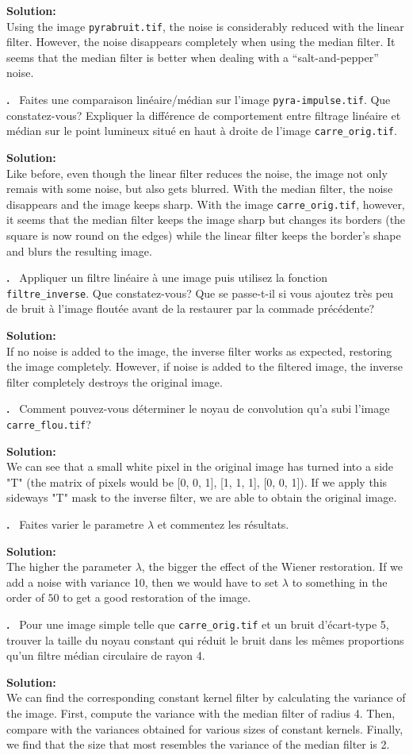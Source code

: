\documentclass{article}
\newcounter{problem}
\newcounter{solution}
\newcommand\Problem{%
  \stepcounter{problem}%
  \textbf{\theproblem.}~%
  \setcounter{solution}{0}%
}
\newcommand\Solution{%
  \textbf{Solution:}\\%
}
\begin{document}
\Solution Using the image \texttt{pyrabruit.tif}, the noise is considerably reduced with the linear filter. However, the noise disappears completely when using the median filter. It seems that the median filter is better when dealing with a ``salt-and-pepper'' noise.

\Problem Faites une comparaison linéaire/médian sur l'image \texttt{pyra-impulse.tif}. Que constatez-vous? Expliquer la différence de comportement entre filtrage linéaire et médian sur le point lumineux situé en haut à droite de l'image \texttt{carre\_orig.tif}.

\Solution Like before, even though the linear filter reduces the noise, the image not only remais with some noise, but also gets blurred. With the median filter, the noise disappears and the image keeps sharp. With the image \texttt{carre\_orig.tif}, however, it seems that the median filter keeps the image sharp but changes its borders (the square is now round on the edges) while the linear filter keeps the border's shape and blurs the resulting image.

\Problem Appliquer un filtre linéaire à une image puis utilisez la fonction \texttt{filtre\_inverse}. Que constatez-vous? Que se passe-t-il si vous ajoutez très peu de bruit à l'image floutée avant de la restaurer par la commade précédente?

\Solution If no noise is added to the image, the inverse filter works as expected, restoring the image completely. However, if noise is added to the filtered image, the inverse filter completely destroys the original image.

\Problem Comment pouvez-vous déterminer le noyau de convolution qu'a subi l'image \texttt{carre\_flou.tif}?

\Solution We can see that a small white pixel in the original image has turned into a side "T" (the matrix of pixels would be [0, 0, 1], [1, 1, 1], [0, 0, 1]). If we apply this sideways "T" mask to the inverse filter, we are able to obtain the original image.

\Problem Faites varier le parametre $\lambda$ et commentez les résultats.

\Solution The higher the parameter $\lambda$, the bigger the effect of the Wiener restoration. If we add a noise with variance 10, then we would have to set $\lambda$ to something in the order of $50$ to get a good restoration of the image.

\Problem Pour une image simple telle que \texttt{carre\_orig.tif} et un bruit d'écart-type 5, trouver la taille du noyau constant qui réduit le bruit dans les mêmes proportions qu'un filtre médian circulaire de rayon 4.

\Solution We can find the corresponding constant kernel filter by calculating the variance of the image. First, compute the variance with the median filter of radius 4. Then, compare with the variances obtained for various sizes of constant kernels. Finally, we find that the size that most resembles the variance of the median filter is 2.
\end{document}
